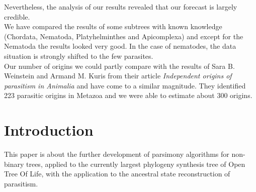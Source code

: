  Nevertheless, the analysis of our results revealed that our forecast is largely credible. \\
  We have compared the results of some subtrees with known knowledge (Chordata, Nematoda, 
    Platyhelminthes and Apicomplexa) and except for the Nematoda the results looked very good. In 
    the case of nematodes, the data situation is strongly shifted to the few parasites. \\
  Our number of origins we could partly compare with the results of Sara B. Weinstein and Armand M. 
  Kuris from their article \textit{Independent origins of parasitism in Animalia} \cite{Weinstein2016} 
    and have come to a similar magnitude. They identified 223 parasitic origins in Metazoa and we 
    were able to estimate about 300 origins. \\
    
\tableofcontents
\clearpage

\chapter{Introduction}
  This paper is about the further development of parsimony algorithms for non-binary trees, applied 
  to the currently largest phylogeny synthesis tree of Open Tree Of Life, with the application to 
  the ancestral state reconstruction of parasitism. \\
   \\
   \\

